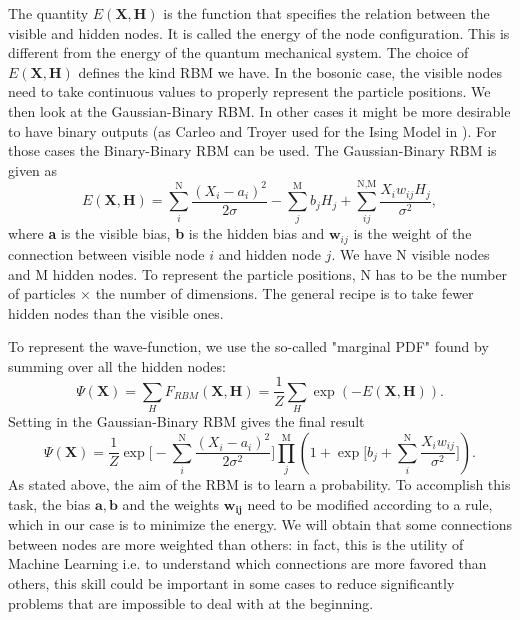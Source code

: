 The quantity $E(\textbf{X},\textbf{H})$ is the function that specifies the relation between the visible and hidden nodes. It is called the energy of the node configuration. This is different from the energy of the quantum mechanical system. The choice of $E(\textbf{X},\textbf{H})$ defines the kind RBM we have. In the bosonic case, the visible nodes need to take continuous values to properly represent the particle positions. We then look at the Gaussian-Binary RBM. In other cases it might be more desirable to have binary outputs (as Carleo and Troyer used for the Ising Model in \cite{carleoSolvingQuantumManybody2017}). For those cases the Binary-Binary RBM can be used. The Gaussian-Binary RBM is given as 
\begin{equation*}
E(\textbf{X},\textbf{H}) = \sum_i^{\text{N}}\frac{(X_i-a_i)^2}{2\sigma} - \sum_j^{\text{M}}b_jH_j + \sum_{ij}^{\text{N,M}}\frac{X_iw_{ij}H_j}{\sigma^2},
\label{eq_rbm}
\end{equation*}
where \textbf{a} is the visible bias, \textbf{b} is the hidden bias and $\textbf{w}_{ij}$ is the weight of the connection between visible node $i$ and hidden node $j$. We have N visible nodes and M hidden nodes. To represent the particle positions, N has to be the number of particles $\times$ the number of dimensions.  The general recipe is to take fewer hidden nodes than the visible ones.

To represent the wave-function, we use the so-called "marginal PDF" found by summing over all the hidden nodes:
\begin{equation*}
\Psi(\textbf{X}) = \sum_HF_{RBM}(\textbf{X},\textbf{H}) = \frac{1}{Z}\sum_H\exp(-E(\textbf{X},\textbf{H})).
\end{equation*}
Setting in the Gaussian-Binary RBM gives the final result
\begin{equation*}
\Psi(\mathbf{X}) = \frac{1}{Z} \exp\bigg[-\sum_i^{\text{N}} \frac{(X_i-a_i)^2}{2\sigma^2}\bigg]\prod_j^{\text{M}} \left(  1 + \exp\bigg[b_j +\sum_i^{\text{N}} \frac{X_iw_{ij}}{\sigma^2}\bigg]\right).
\label{eq_psi}
\end{equation*}
As stated above, the aim of the RBM is to learn a probability. To accomplish this task, the bias $\mathbf{a},\mathbf{b}$ and the weights $\mathbf{w_{ij}}$ need to be modified according to a rule, which in our case is to minimize the energy. We will obtain that some connections between nodes are more weighted than others: in fact, this is the utility of Machine Learning i.e. to understand which connections are more favored than others, this skill could be important in some cases to reduce significantly problems that are impossible to deal with at the beginning.


